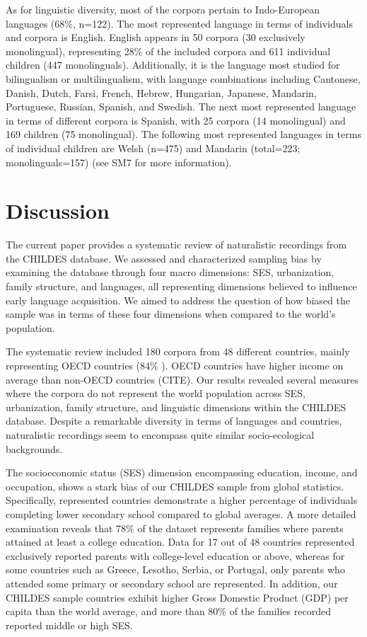 \documentclass[
  man,floatsintext]{apa6}
\begin{document}
As for linguistic diversity, most of the corpora pertain to Indo-European languages (68\%, n=122). The most represented language in terms of individuals and corpora is English. English appears in 50 corpora (30 exclusively monolingual), representing 28\% of the included corpora and 611 individual children (447 monolinguals). Additionally, it is the language most studied for bilingualism or multilingualism, with language combinations including Cantonese, Danish, Dutch, Farsi, French, Hebrew, Hungarian, Japanese, Mandarin, Portuguese, Russian, Spanish, and Swedish. The next most represented language in terms of different corpora is Spanish, with 25 corpora (14 monolingual) and 169 children (75 monolingual). The following most represented languages in terms of individual children are Welsh (n=475) and Mandarin (total=223; monolinguals=157) (see SM7 for more information).

\hypertarget{discussion}{%
\section{Discussion}\label{discussion}}

The current paper provides a systematic review of naturalistic recordings from the CHILDES database. We assessed and characterized sampling bias by examining the database through four macro dimensions: SES, urbanization, family structure, and languages, all representing dimensions believed to influence early language acquisition. We aimed to address the question of how biased the sample was in terms of these four dimensions when compared to the world's population.

The systematic review included 180 corpora from 48 different countries, mainly representing OECD countries (84\% ). OECD countries have higher income on average than non-OECD countries (CITE). Our results revealed several measures where the corpora do not represent the world population across SES, urbanization, family structure, and linguistic dimensions within the CHILDES database. Despite a remarkable diversity in terms of languages and countries, naturalistic recordings seem to encompass quite similar socio-ecological backgrounds.

The socioeconomic status (SES) dimension encompassing education, income, and occupation, shows a stark bias of our CHILDES sample from global statistics. Specifically, represented countries demonstrate a higher percentage of individuals completing lower secondary school compared to global averages. A more detailed examination reveals that 78\% of the dataset represents families where parents attained at least a college education. Data for 17 out of 48 countries represented exclusively reported parents with college-level education or above, whereas for some countries such as Greece, Lesotho, Serbia, or Portugal, only parents who attended some primary or secondary school are represented.
In addition, our CHILDES sample countries exhibit higher Gross Domestic Product (GDP) per capita than the world average, and more than 80\% of the families recorded reported middle or high SES.
\end{document}
